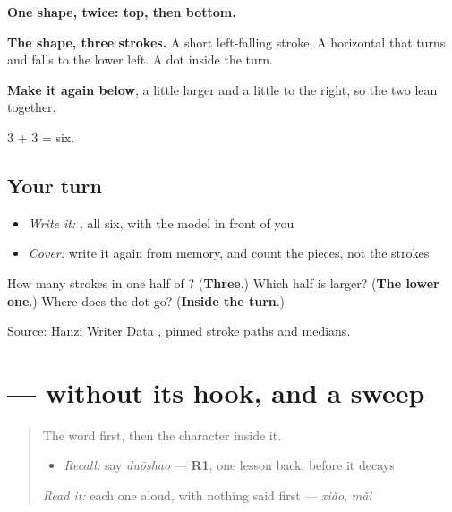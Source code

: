 \begin{quote}
\end{quote}

\textbf{One shape, twice: top, then bottom.}

\textbf{The shape, three strokes.} A short left-falling stroke. A horizontal that turns and falls to the lower left. A dot inside the turn.

\textbf{Make it again below}, a little larger and a little to the right, so the two lean together.

3 + 3 = six.

\subsection*{Your turn}
\begin{itemize}
\raggedright
  \item \emph{Write it:} , all six, with the model in front of you
  \item \emph{Cover:} write it again from memory, and count the pieces, not the strokes
\end{itemize}

\begin{tcolorbox}[breakable,colback=teal!4,colframe=teal!35!black,title={Before you move on}]
How many strokes in one half of ? (\textbf{Three}.) Which half is larger? (\textbf{The lower one}.) Where does the dot go? (\textbf{Inside the turn}.)

Source: \href{https://raw.githubusercontent.com/chanind/hanzi-writer-data/68d10a4b21150cae5e1ebbd223eed289cf32d90c/data/\%E5\%A4\%9A.json}{Hanzi Writer Data , pinned stroke paths and medians}.
\end{tcolorbox}
\section[\texorpdfstring{\zh{少} (shǎo)}{少 (shǎo)}]{ —  without its hook, and a sweep}

\label{lesson:ZH-W41-shao}



\begin{quote}
The word first, then the character inside it.

\begin{itemize}
\raggedright
  \item \emph{Recall:} say \emph{duōshao} — \textbf{R1}, one lesson back, before it decays
\end{itemize}

\begin{quote}
 
\end{quote}

\emph{Read it:} each one aloud, with nothing said first — \emph{xiǎo}, \emph{mǎi}
\end{quote}

